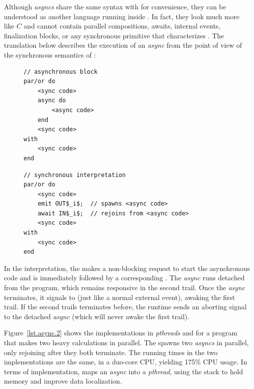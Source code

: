 Although \emph{asyncs} share the same syntax with \CEU for convenience, they 
can be understood as another language running inside \CEU.
%
In fact, they look much more like $C$ and cannot contain parallel compositions, 
awaits, internal events, finalization blocks, or any synchronous primitive that 
characterizes \CEU.
%
The translation below describes the execution of an \emph{async} from the point 
of view of the synchronous semantics of \CEU:

\begin{figure}[h!]
\begin{minipage}[t]{0.44\linewidth}
\begin{lstlisting}
// asynchronous block
par/or do
    <sync code>
    async do
        <async code>
    end
    <sync code>
with
    <sync code>
end
\end{lstlisting}
\end{minipage}
%
\begin{minipage}[t]{0.56\linewidth}
\begin{lstlisting}
// synchronous interpretation
par/or do
    <sync code>
    emit OUT$_i$;  // spawns <async code>
    await IN$_i$;  // rejoins from <async code>
    <sync code>
with
    <sync code>
end
\end{lstlisting}
\end{minipage}
\end{figure}

In the interpretation, the  makes a non-blocking request to 
start the asynchronous code and is immediately followed by a corresponding 
.
%
The \emph{async} runs detached from the \CEU program, which remains responsive 
in the second trail.
%
Once the \emph{async} terminates, it signals  to \CEU (just like a 
normal external event), awaking the first trail.
%
If the second trails terminates before, the \CEU runtime sends an aborting 
signal to the detached \emph{async} (which will never awake the first trail).

Figure~\ref{lst.async.2} shows the implementations in \emph{pthreads} and \CEU 
for a program that makes two heavy calculations in parallel.
%
The  spawns two \emph{asyncs} in parallel, only rejoining after 
they both terminate.
%
The running times in the two implementations are the same, in a duo-core CPU, 
yielding 175\% CPU usage.
%
In terms of implementation, \CEU maps an \emph{async} into a \emph{pthread}, 
using the stack to hold memory and improve data localization.

